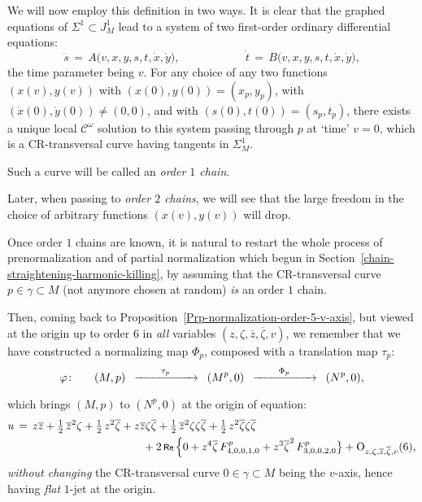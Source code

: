 \documentclass[12pt,twoside,leqno,openany]{amsart}
\begin{document}
\smallskip

We will now employ this definition in two ways. 
It is clear that the graphed equations of $\Sigma^1 \subset 
J_M^1$ lead to a system of two first-order ordinary
differential equations:
\[
\dot{s}
\,=\,
A
\big(
v,x,y,s,t,\dot{x},\dot{y}
\big),
\ \ \ \ \ \ \ \ \ \ \ \ \ \ \ \ \ \ \ \ \ \ \ \ \ \
\dot{t}
\,=\,
B
\big(
v,x,y,s,t,\dot{x},\dot{y}
\big),
\]
the time parameter being $v$. 
For any choice of any two functions $(x(v), y(v))$ 
with $(x(0), y(0)) = (x_p, y_p)$, 
with $(\dot{x}(0), \dot{y}(0)) \neq (0,0)$, 
and with $(s(0), t(0)) = (s_p, t_p)$,
there exists a unique local $\mathcal{C}^\omega$
solution to this system passing through $p$ at
`time' $v = 0$,
which is a CR-transversal curve having tangents
in $\Sigma_M^1$. 

\begin{Terminology}
Such a curve will be called an {\sl order $1$ chain}.
\end{Terminology}

Later, when passing to {\sl order $2$ chains},
we will see that the large freedom 
in the choice of arbitrary functions $(x(v), y(v))$
will drop.

\smallskip

Once order $1$ chains are known, it is natural
to restart the whole process of prenormalization
and of partial normalization which begun in 
Section~{\ref{chain-straightening-harmonic-killing}},
by assuming that the CR-transversal
curve $p \in \gamma \subset M$
(not anymore chosen at random)
{\em is} an order $1$ chain.

\smallskip

Then, coming back to
Proposition~{\ref{Prp-normalization-order-5-v-axis}},
but viewed at the origin up to order $6$
in {\em all} variables $(z, \zeta, \overline{z}, \overline{\zeta},
v)$,  
we remember that we have constructed a normalizing map $\Phi_p$,
composed with a translation map $\tau_p$:
\[
\varphi
\colon\ \ \ \ \
(M,p)
\,\,\,\xrightarrow[{\rule[0pt]{50pt}{0pt}}]{\tau_p}\,\,\,
(M^p,0)
\,\,\,\xrightarrow[{\rule[0pt]{50pt}{0pt}}]{\Phi_p}\,\,\,
(N^p,0),
\]
which brings $(M, p)$ to $(N^p, 0)$ at the origin of equation:
\[
\aligned
u
&
\,=\,
z\overline{z}
+
\tfrac{1}{2}\,\overline{z}^2\zeta
+
\tfrac{1}{2}\,z^2\overline{\zeta}
+
z\overline{z}\zeta\overline{\zeta}
+
\tfrac{1}{2}\,\overline{z}^2\zeta\zeta\overline{\zeta}
+
\tfrac{1}{2}\,z^2\overline{\zeta}\zeta\overline{\zeta}
\\
&
\ \ \ \ \ \ \ \ \ \ \ \ \ \ \ \ \ \ \ \ \ \ \ \ \ \ \ \ \ \ \ \ \ \ \
+
2\,\Re\,
\Big\{
0
+
z^4\overline{\zeta}\,
F_{4,0,0,1,0}^p
+
z^3\overline{\zeta}^2\,
F_{3,0,0,2,0}^p
\big\}
+
{\rm O}_{z,\zeta,\overline{z},\overline{\zeta},v}(6),
\endaligned
\]
{\em without changing} the CR-transversal curve 
$0 \in \gamma \subset M$ being the $v$-axis,
hence having {\em flat} $1$-jet at the origin.
\end{document}
